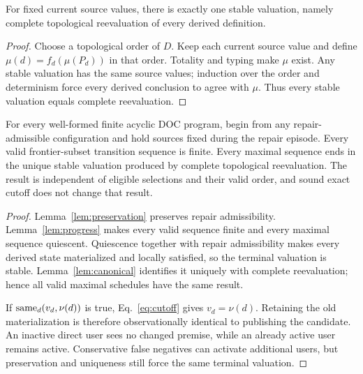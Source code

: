 \begin{lemma}\label{lem:canonical}
For fixed current source values, there is exactly one stable valuation, namely complete topological reevaluation of every derived definition.
\end{lemma}
\begin{proof}
Choose a topological order of $D$. Keep each current source value and define $\mu(d)=f_d(\mu(P_d))$ in that order. Totality and typing make $\mu$ exist. Any stable valuation has the same source values; induction over the order and determinism force every derived conclusion to agree with $\mu$. Thus every stable valuation equals complete reevaluation.
\end{proof}

\begin{theorem}\label{thm:finite}
For every well-formed finite acyclic DOC program, begin from any repair-admissible configuration and hold sources fixed during the repair episode. Every valid frontier-subset transition sequence is finite. Every maximal sequence ends in the unique stable valuation produced by complete topological reevaluation. The result is independent of eligible selections and their valid order, and sound exact cutoff does not change that result.
\end{theorem}
\begin{proof}
Lemma~\ref{lem:preservation} preserves repair admissibility. Lemma~\ref{lem:progress} makes every valid sequence finite and every maximal sequence quiescent. Quiescence together with repair admissibility makes every derived state materialized and locally satisfied, so the terminal valuation is stable. Lemma~\ref{lem:canonical} identifies it uniquely with complete reevaluation; hence all valid maximal schedules have the same result.

If $\operatorname{same}_d(v_d,\nu(d))$ is true, Eq.~\eqref{eq:cutoff} gives $v_d=\nu(d)$. Retaining the old materialization is therefore observationally identical to publishing the candidate. An inactive direct user sees no changed premise, while an already active user remains active. Conservative false negatives can activate additional users, but preservation and uniqueness still force the same terminal valuation.
\end{proof}

